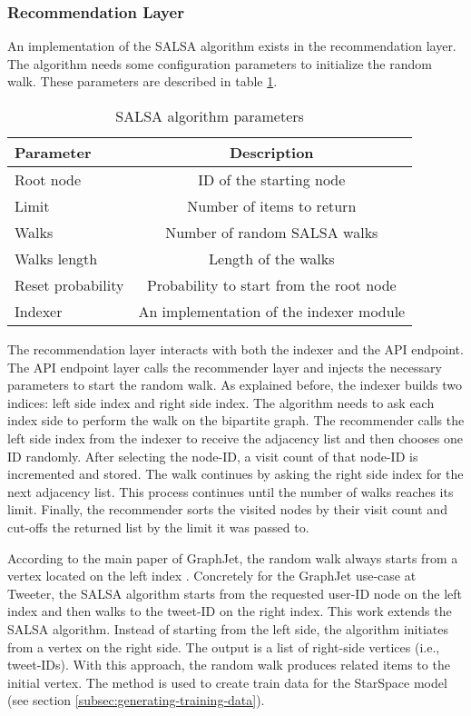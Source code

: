 \subsubsection{Recommendation Layer}
\label{subsubsec:recommendation-layer}
An implementation of the SALSA \cite{lempelSALSAStochasticApproach2001} algorithm exists in the recommendation layer. The algorithm needs some configuration parameters to initialize the random walk. These parameters are described in table \ref{tab:salsa-parameters}.


\begin{table}[!h]
    \centering
    \caption{SALSA algorithm parameters}
    \label{tab:salsa-parameters}
    \begin{tabular}{|l|c|}
        \hline
        \textbf{Parameter} & \textbf{Description} \\
        \hline
        Root node & ID of the starting node \\
        \hline
        Limit & Number of items to return \\
        \hline
        Walks & Number of random SALSA walks \\
        \hline
        Walks length & Length of the walks \\
        \hline
        Reset probability & Probability to start from the root node \\
        \hline
        Indexer & An implementation of the indexer module \\
        \hline
    \end{tabular}
\end{table}


The recommendation layer interacts with both the indexer and the API endpoint. The API endpoint layer calls the recommender layer and injects the necessary parameters to start the random walk. As explained before, the indexer builds two indices: left side index and right side index. The algorithm needs to ask each index side to perform the walk on the bipartite graph. The recommender calls the left side index from the indexer to receive the adjacency list and then chooses one ID randomly. After selecting the node-ID, a visit count of that node-ID is incremented and stored. The walk continues by asking the right side index for the next adjacency list. This process continues until the number of walks reaches its limit. Finally, the recommender sorts the visited nodes by their visit count and cut-offs the returned list by the limit it was passed to.


According to the main paper of GraphJet, the random walk always starts from a vertex located on the left index \cite{sharmaGraphJetRealtimeContent2016}. Concretely for the GraphJet use-case at Tweeter, the SALSA algorithm starts from the requested user-ID node on the left index and then walks to the tweet-ID on the right index. This work extends the SALSA algorithm. Instead of starting from the left side, the algorithm initiates from a vertex on the right side. The output is a list of right-side vertices (i.e., tweet-IDs). With this approach, the random walk produces related items to the initial vertex. The method is used to create train data for the StarSpace model (see section \ref{subsec:generating-training-data}).

